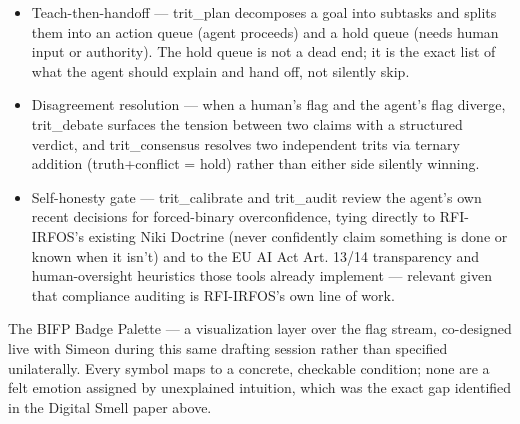 \documentclass[11pt,a4paper]{article}
\begin{document}
\begin{itemize}[leftmargin=14pt, itemsep=2pt]
  \item Teach-then-handoff — trit\_plan decomposes a goal into subtasks and splits them into an action queue (agent proceeds) and a hold queue (needs human input or authority). The hold queue is not a dead end; it is the exact list of what the agent should explain and hand off, not silently skip.
  \item Disagreement resolution — when a human's flag and the agent's flag diverge, trit\_debate surfaces the tension between two claims with a structured verdict, and trit\_consensus resolves two independent trits via ternary addition (truth+conflict = hold) rather than either side silently winning.
  \item Self-honesty gate — trit\_calibrate and trit\_audit review the agent's own recent decisions for forced-binary overconfidence, tying directly to RFI-IRFOS's existing Niki Doctrine (never confidently claim something is done or known when it isn't) and to the EU AI Act Art. 13/14 transparency and human-oversight heuristics those tools already implement — relevant given that compliance auditing is RFI-IRFOS's own line of work.
\end{itemize}

The BIFP Badge Palette — a visualization layer over the flag stream, co-designed live with Simeon during this same drafting session rather than specified unilaterally. Every symbol maps to a concrete, checkable condition; none are a felt emotion assigned by unexplained intuition, which was the exact gap identified in the Digital Smell paper above.
\end{document}
